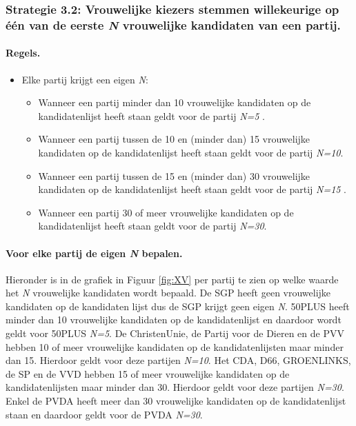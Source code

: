 \subsubsection{Strategie 3.2: Vrouwelijke kiezers stemmen willekeurige op één van de eerste \textit{N} vrouwelijke kandidaten van een partij.}

\paragraph{Regels.}
\begin{itemize}
\item
Elke partij krijgt een eigen \textit{N}:

	\begin{itemize}
		\item
Wanneer een partij minder dan 10 vrouwelijke kandidaten op de kandidatenlijst heeft staan geldt voor de partij \textit{N=5} .
		\item
Wanneer een partij tussen de 10 en (minder dan) 15 vrouwelijke kandidaten op de kandidatenlijst heeft staan geldt voor de partij \textit{N=10}.
		\item
Wanneer een partij tussen de 15 en (minder dan) 30 vrouwelijke kandidaten op de kandidatenlijst heeft staan geldt voor de partij \textit{N=15} .
		\item
Wanneer een partij 30 of meer vrouwelijke kandidaten op de kandidatenlijst heeft staan geldt voor de partij \textit{N=30}.
	\end{itemize}
\end{itemize}


\paragraph{Voor elke partij de eigen \textit{N} bepalen.}
Hieronder is in de grafiek in Figuur \ref{fig:XV} per partij te zien op welke waarde het \textit{N} vrouwelijke kandidaten wordt bepaald. De SGP heeft geen vrouwelijke kandidaten op de kandidaten lijst dus de SGP krijgt geen eigen \textit{N}. 50PLUS heeft minder dan 10 vrouwelijke kandidaten op de kandidatenlijst en daardoor wordt geldt voor 50PLUS \textit{N=5}. De ChristenUnie, de Partij voor de Dieren en de PVV hebben 10 of meer vrouwelijke kandidaten op de kandidatenlijsten maar minder dan 15. Hierdoor geldt voor deze partijen \textit{N=10}. Het CDA, D66, GROENLINKS, de SP en de VVD hebben 15 of meer vrouwelijke kandidaten op de kandidatenlijsten maar minder dan 30. Hierdoor geldt voor deze partijen \textit{N=30}. Enkel de PVDA heeft meer dan 30 vrouwelijke kandidaten op de kandidatenlijst staan en daardoor geldt voor de PVDA \textit{N=30}.

